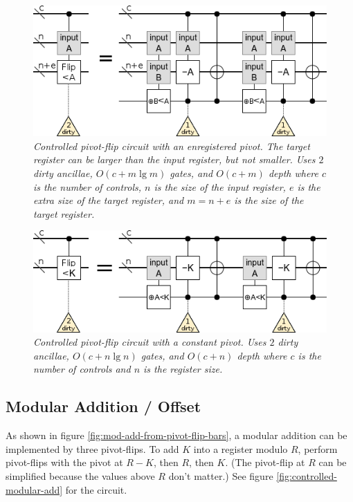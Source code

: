 \documentclass[twocolumn]{article}
\begin{document}
\begin{figure}
  \centering
  \includegraphics[width=\linewidth]{assets/controlled-pivot-flip.png}
  \caption{\em
    Controlled pivot-flip circuit with an enregistered pivot.
    The target register can be larger than the input register, but not smaller.
    Uses $2$ dirty ancillae, $O(c + m \lg m)$ gates, and $O(c + m)$ depth where $c$ is the number of controls, $n$ is the size of the input register, $e$ is the extra size of the target register, and $m=n+e$ is the size of the target register.
  }
  \label{fig:controlled-pivot-flip}
\end{figure}

\begin{figure}
  \centering
  \includegraphics[width=\linewidth]{assets/controlled-const-pivot-flip.png}
  \caption{\em
    Controlled pivot-flip circuit with a constant pivot.
    Uses $2$ dirty ancillae, $O(c + n \lg n)$ gates, and $O(c + n)$ depth where $c$ is the number of controls and $n$ is the register size.
  }
  \label{fig:controlled-const-pivot-flip}
\end{figure}


\subsection{Modular Addition / Offset}

As shown in figure \ref{fig:mod-add-from-pivot-flip-bars}, a modular addition can be implemented by three pivot-flips.
To add $K$ into a register modulo $R$, perform pivot-flips with the pivot at $R-K$, then $R$, then $K$.
(The pivot-flip at $R$ can be simplified because the values above $R$ don't matter.)
See figure \ref{fig:controlled-modular-add} for the circuit.
\end{document}
